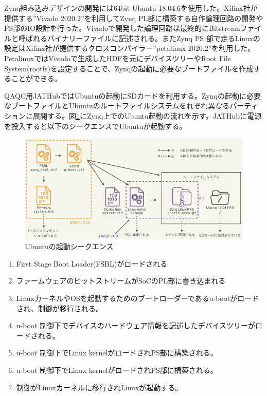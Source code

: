 Zynq組み込みデザインの開発には64bit Ubuntu 18.04.6を使用した。Xilinx社が提供する”Vivado 2020.2”を利用してZynq PL部に構築する自作論理回路の開発やPS部のIO設計を行った。Vivadoで開発した論理回路は最終的にBitstreamファイルと呼ばれるバイナリーファイルに記述される。またZynq PS 部で走るLinuxの設定はXilinx社が提供するクロスコンパイラー”petalinux 2020.2”を利用した。PetalinuxではVivadoで生成したHDFを元にデバイスツリーやRoot File System(rootfs)を設定することで、Zynqの起動に必要なブートファイルを作成することができる。\par
QAQC用JATHubではUbuntuの起動にSDカードを利用する。Zynqの起動に必要なブートファイルとUbuntuのルートファイルシステムをれぞれ異なるパーティションに展開する。図\ref{JATHubboot}にZynq上でのUbuntu起動の流れを示す\cite{mt_okazaki}。JATHubに電源を投入すると以下のシークエンスでUbuntuが起動する。

\begin{figure} 
\centering
\includegraphics[width=16cm]{fig/QAQC/JATHubboot.png}
\caption[Ubuntuの起動シークエンス]{Ubuntuの起動シークエンス}
\label{JATHubboot}
\end{figure}

\begin{enumerate}
    \item First Stage Boot Loader(FSBL)がロードされる
    \item ファームウェアのビットストリームがSoCのPL部に書き込まれる
    \item LinuxカーネルやOSを起動するためのブートローダーであるu-bootがロードされ、制御が移行される。
    \item u-boot 制御下でデバイスのハードウェア情報を記述したデバイスツリーがロードされる。
    \item u-boot 制御下でLinux kernelがロードされPS部に構築される。
    \item u-boot 制御下でLinux kernelがロードされPS部に構築される。
    \item 制御がLinuxカーネルに移行されLinuxが起動する。
\end{enumerate}

